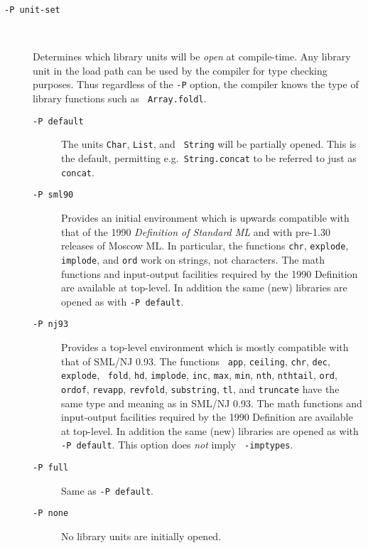 \documentclass[fleqn]{article}
\begin{document}
\begin{description}
\item[{\tt -P {\rm unit-set}}]\mbox{ }

  Determines which library units will be {\em open\/} at compile-time.
  Any library unit in the load path can be used by the compiler for
  type checking purposes.  Thus regardless of the {\tt -P} option, the
  compiler knows the type of library functions such as {\tt
    Array.foldl}.

  \begin{description}
  \item[{\tt -P default}] The units {\tt Char}, {\tt List}, and {\tt
      String} will be partially opened.  This is the default,
    permitting e.g.\ {\tt String.concat} to be referred to just as
    {\tt concat}.

  \item[{\tt -P sml90}] Provides an initial environment which is
    upwards compatible with that of the 1990 {\em Definition of
      Standard ML\/} and with pre-1.30 releases of Moscow ML\@.  In
    particular, the functions {\tt chr}, {\tt explode}, {\tt implode},
    and {\tt ord} work on strings, not characters.  The math functions
    and input-output facilities required by the 1990 Definition
    \cite[Appendix C and D]{Milner:1990:TheDefinition} are available
    at top-level.  In addition the same (new) libraries are opened as
    with {\tt -P default}.

  \item[{\tt -P nj93}] Provides a top-level environment which is
    mostly compatible with that of SML/NJ 0.93.  The functions {\tt
      app}, {\tt ceiling}, {\tt chr}, {\tt dec}, {\tt explode}, {\tt
      fold}, {\tt hd}, {\tt implode}, {\tt inc}, {\tt max}, {\tt min},
    {\tt nth}, {\tt nthtail}, {\tt ord}, {\tt ordof}, {\tt revapp},
    {\tt revfold}, {\tt substring}, {\tt tl}, and {\tt truncate} have
    the same type and meaning as in SML/NJ 0.93.  The math functions
    and input-output facilities required by the 1990 Definition
    \cite[Appendix C and D]{Milner:1990:TheDefinition} are available
    at top-level.  In addition the same (new) libraries are opened as
    with {\tt -P default}.  This option does {\em not\/} imply {\tt
      -imptypes}.

  \item[{\tt -P full}] Same as {\tt -P default}.

  \item[{\tt -P none}] No library units are initially opened.
  \end{description}
  

\end{description}
\end{document}
